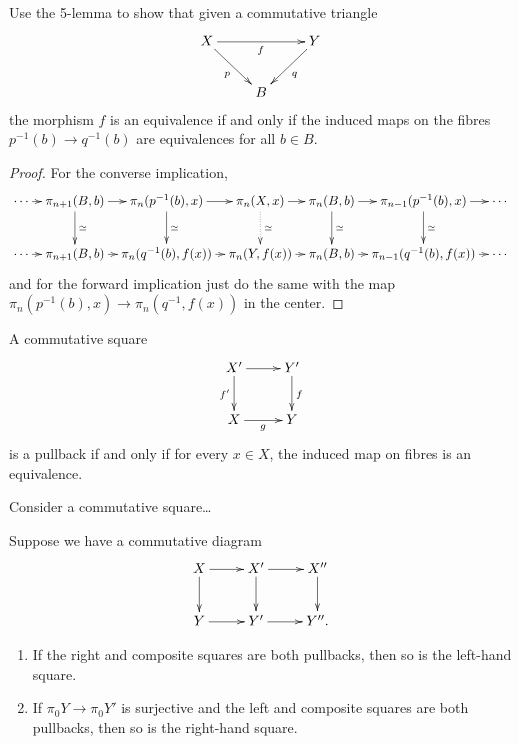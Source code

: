 \begin{exercise}[2.2]
\label{exercise-2.2}
Use the 5-lemma to show that given a commutative triangle
$$
\xymatrix{
X \ar[rd]_{p} \ar[rr]_{f} && Y \ar[dl]^{q} \\
& B
}
$$
the morphism $f$ is an equivalence if and only if
the induced maps on the fibres
$p^{-1}(b)\to q^{-1}(b)$ are equivalences for all $b \in B$.
\end{exercise}

\begin{proof}
For the converse implication,
$$
\xymatrixcolsep{.7em}
\xymatrix{
\cdots \ar[r]&\pi_{n+1}(B,b)\ar[r]\ar[d]^{\simeq}
&\pi_n(p^{-1}(b),x)\ar[r]\ar[d]^{\simeq}
&\pi_n(X,x)\ar[r]\ar@{.>}[d]^{\simeq }
&\pi_n(B,b)\ar[r]\ar[d]^{\simeq}
&\pi_{n-1}(p^{-1}(b),x)\ar[d]^{\simeq}\ar[r]&\cdots\\
\cdots\ar[r]&\pi_{n+1}(B,b)\ar[r]&\pi_n(q^{-1}(b),f(x))\ar[r]&\pi_n(Y,f(x))\ar[r]&
\pi_n(B,b)\ar[r]&\pi_{n-1}(q^{-1}(b),f(x))\ar[r]&\cdots
}
$$
and for the forward implication just do the same with
the map $\pi_n(p^{-1}(b),x)\to \pi_n(q^{-1},f(x))$ in the center.
\end{proof}

\begin{lemma}
\label{lemma-pullback-iff-fiber-maps-are-equivalences}
A commutative square
$$
\xymatrix{
X'\ar[r]\ar[d]_{f'}&Y'\ar[d]^{f}\\
X\ar[r]_{g}&Y
}
$$
is a pullback if and only if for every $x \in X$,
the induced map on fibres is an equivalence.
\end{lemma}

\begin{exercise}[2.3]
\label{exercise-2.3}
Consider a commutative square…

\end{exercise}

\begin{exercise}[2.4]
\label{exercise-2.4}
Suppose we have a commutative diagram
$$
\xymatrix{
X\ar[r]\ar[d]&X'\ar[d]\ar[r]& X''\ar[d]\\
Y\ar[r]&Y'\ar[r]&Y''.
}
$$
\begin{enumerate}
\item If the right and composite squares are both pullbacks,
then so is the left-hand square.
\item If $\pi_0Y \to \pi_0Y'$ is surjective
and the left and composite squares
are both pullbacks,
then so is the right-hand square.
\end{enumerate}
\end{exercise}


